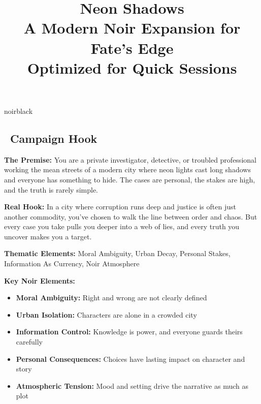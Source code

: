 \documentclass[11pt]{article}
\title{\Huge\textbf{Neon Shadows}\\
\Large A Modern Noir Expansion for Fate's Edge\\
\large Optimized for Quick Sessions}
\author{}
\date{}
\begin{document}
\maketitle

\begin{center}
\end{center}

\begin{noirsection}{noirblack}
\subsection*{\faMap\ Campaign Hook}

\textbf{The Premise:} You are a private investigator, detective, or troubled professional working the mean streets of a modern city where neon lights cast long shadows and everyone has something to hide. The cases are personal, the stakes are high, and the truth is rarely simple.

\textbf{Real Hook:} In a city where corruption runs deep and justice is often just another commodity, you've chosen to walk the line between order and chaos. But every case you take pulls you deeper into a web of lies, and every truth you uncover makes you a target.

\textbf{Thematic Elements:} Moral Ambiguity, Urban Decay, Personal Stakes, Information As Currency, Noir Atmosphere

\textbf{Key Noir Elements:}
\begin{itemize}
    \item \textbf{Moral Ambiguity:} Right and wrong are not clearly defined
    \item \textbf{Urban Isolation:} Characters are alone in a crowded city
    \item \textbf{Information Control:} Knowledge is power, and everyone guards theirs carefully
    \item \textbf{Personal Consequences:} Choices have lasting impact on character and story
    \item \textbf{Atmospheric Tension:} Mood and setting drive the narrative as much as plot
\end{itemize}
\end{noirsection}
\end{document}

